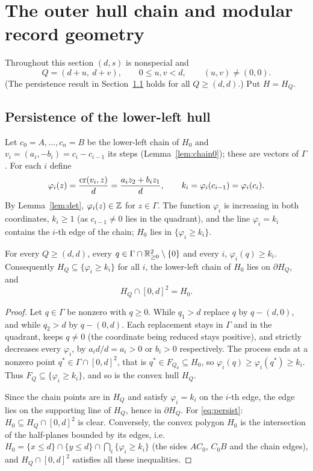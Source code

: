 
\section{The outer hull chain and modular record geometry}\label{sec:chain}

Throughout this section $(d,s)$ is nonspecial and
\[
  Q=(d+u,\ d+v),\qquad 0\le u,v<d,\qquad(u,v)\ne(0,0).
\]
(The persistence result in Section~\ref{sec:persist} holds for all $Q\ge(d,d)$.) Put $H=H_Q$.

\subsection{Persistence of the lower-left hull}\label{sec:persist}

Let $c_0=A,\dots,c_n=B$ be the lower-left chain of $H_0$ and $v_i=(a_i,-b_i)=c_i-c_{i-1}$ its steps (Lemma~\ref{lem:chain0}); these are vectors of $\Gamma$. For each $i$ define
\[
  \varphi_i(z)=\frac{\operatorname{cr}(v_i,z)}{d}=\frac{a_iz_2+b_iz_1}{d},\qquad k_i=\varphi_i(c_{i-1})=\varphi_i(c_i).
\]
By Lemma~\ref{lem:det}, $\varphi_i(z)\in\mathbb Z$ for $z\in\Gamma$. The function $\varphi_i$ is increasing in both coordinates, $k_i\ge1$ (as $c_{i-1}\ne0$ lies in the quadrant), and the line $\varphi_i=k_i$ contains the $i$-th edge of the chain; $H_0$ lies in $\{\varphi_i\ge k_i\}$.

\begin{proposition}[Persistence]\label{prop:persist}
For every $Q\ge(d,d)$, every $q\in\Gamma\cap\mathbb R_{\ge0}^2\setminus\{0\}$ and every $i$, $\varphi_i(q)\ge k_i$. Consequently $H_Q\subseteq\{\varphi_i\ge k_i\}$ for all $i$, the lower-left chain of $H_0$ lies on $\partial H_Q$, and
\begin{equation}\label{eq:persist}
  H_Q\cap[0,d]^2=H_0.
\end{equation}
\end{proposition}
\begin{proof}
Let $q\in\Gamma$ be nonzero with $q\ge0$. While $q_1>d$ replace $q$ by $q-(d,0)$, and while $q_2>d$ by $q-(0,d)$. Each replacement stays in $\Gamma$ and in the quadrant, keeps $q\ne0$ (the coordinate being reduced stays positive), and strictly decreases every $\varphi_i$, by $a_id/d=a_i>0$ or $b_i>0$ respectively. The process ends at a nonzero point $q^*\in\Gamma\cap[0,d]^2$, that is $q^*\in F_{Q_0}\subseteq H_0$, so $\varphi_i(q)\ge\varphi_i(q^*)\ge k_i$. Thus $F_Q\subseteq\{\varphi_i\ge k_i\}$, and so is the convex hull $H_Q$.

Since the chain points are in $H_Q$ and satisfy $\varphi_i=k_i$ on the $i$-th edge, the edge lies on the supporting line of $H_Q$, hence in $\partial H_Q$. For \eqref{eq:persist}: $H_0\subseteq H_Q\cap[0,d]^2$ is clear. Conversely, the convex polygon $H_0$ is the intersection of the half-planes bounded by its edges, i.e. $H_0=\{x\le d\}\cap\{y\le d\}\cap\bigcap_i\{\varphi_i\ge k_i\}$ (the sides $AC_0$, $C_0B$ and the chain edges), and $H_Q\cap[0,d]^2$ satisfies all these inequalities.
\end{proof}

